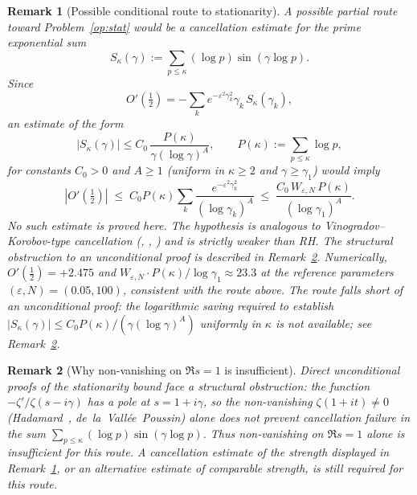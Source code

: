 \documentclass[11pt]{article}
\newtheorem*{remark}{Remark}
\begin{document}
\begin{remark}[Possible conditional route to stationarity]
\label{rem:stat-conditional}
A possible partial route toward Problem~\ref{op:stat} would be a cancellation
estimate for the prime exponential sum
\[
S_\kappa(\gamma):=\sum_{p\le\kappa}(\log p)\sin(\gamma\log p).
\]
Since
\[
O'(\tfrac12)=-\sum_k e^{-\varepsilon^2\gamma_k^2}\gamma_k\,S_\kappa(\gamma_k),
\]
an estimate of the form
\[
|S_\kappa(\gamma)|\le C_0\,\frac{P(\kappa)}{\gamma(\log\gamma)^A},
\qquad P(\kappa):=\sum_{p\le\kappa}\log p,
\]
for constants $C_0>0$ and $A\ge 1$ (uniform in $\kappa\ge 2$ and
$\gamma\ge\gamma_1$) would imply
\[
|O'(\tfrac12)|\;\le\;
C_0 P(\kappa)\sum_k \frac{e^{-\varepsilon^2\gamma_k^2}}{(\log\gamma_k)^A}
\;\le\;
\frac{C_0\,W_{\varepsilon,N}\,P(\kappa)}{(\log\gamma_1)^A}.
\]
No such estimate is proved here. The hypothesis is analogous to
Vinogradov--Korobov-type cancellation (\cite{Bellotti24a,Bellotti24b},
\cite{MossinghoffTrudgianYang24}, \cite{Ramare12}) and is strictly
weaker than RH. The structural obstruction to an unconditional proof
is described in Remark~\ref{rem:selection-direct}.
Numerically, $O'(\tfrac12)=+2.475$ and
$W_{\varepsilon,N}\cdot P(\kappa)/\log\gamma_1\approx 23.3$
at the reference parameters $(\varepsilon,N)=(0.05,100)$,
consistent with the route above.
The route falls short of an unconditional proof: the logarithmic saving
required to establish $|S_\kappa(\gamma)|\le C_0 P(\kappa)/(\gamma(\log\gamma)^A)$
uniformly in $\kappa$ is not available; see Remark~\ref{rem:selection-direct}.
\end{remark}

\begin{remark}[Why non-vanishing on $\Re s=1$ is insufficient]
\label{rem:selection-direct}
Direct unconditional proofs of the stationarity bound face a
structural obstruction: the function $-\zeta'/\zeta(s-i\gamma)$
has a pole at $s=1+i\gamma$, so the non-vanishing $\zeta(1+it)\neq 0$
(Hadamard~\cite{Hadamard}, de~la~Vall\'ee~Poussin) alone does not prevent
cancellation failure
in the sum $\sum_{p\le\kappa}(\log p)\sin(\gamma\log p)$.
Thus non-vanishing on $\Re s=1$ alone is insufficient for this route.
A cancellation estimate of the strength displayed in
Remark~\ref{rem:stat-conditional}, or an alternative estimate of
comparable strength, is still required for this route.
\end{remark}
\end{document}
